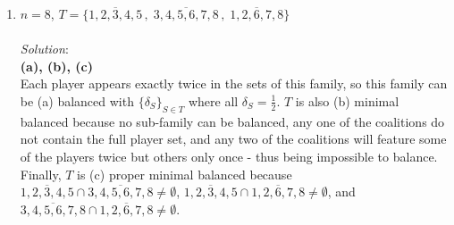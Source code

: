 \documentclass{article}
\begin{document}
\begin{enumerate}
\begin{enumerate}
    \item $n = 8$, $T = \{\overline{1, 2, 3, 4, 5}\,, \; \overline{3, 4, 5, 6, 7, 8}\,, \; \overline{1, 2, 6, 7, 8}\}$\\\\
    \textit{Solution}:\\
    \textbf{(a), (b), (c)}\\
    Each player appears exactly twice in the sets of this family, so this family can be (a) balanced with $\{\delta_{S}\}_{S \in T}$ where all $\delta_{S} = \frac{1}{2}$. $T$ is also (b) minimal balanced because no sub-family can be balanced, any one of the coalitions do not contain the full player set, and any two of the coalitions will feature some of the players twice but others only once - thus being impossible to balance. Finally, $T$ is (c) proper minimal balanced because $\overline{1, 2, 3, 4, 5} \cap \overline{3, 4, 5, 6, 7, 8} \ne \emptyset$, $\overline{1, 2, 3, 4, 5} \cap \overline{1, 2, 6, 7, 8} \ne \emptyset$, and $\overline{3, 4, 5, 6, 7, 8} \cap \overline{1, 2, 6, 7, 8} \ne \emptyset$.

    \end{enumerate}

\end{enumerate}
\end{document}
